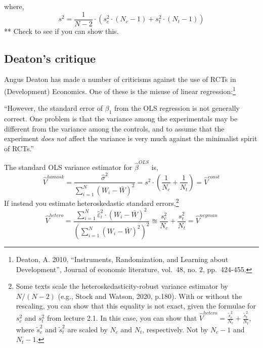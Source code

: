 \documentclass[
  letterpaper,
  DIV=11,
  numbers=noendperiod]{scrreprt}
\theoremstyle{definition}
\theoremstyle{remark}
\begin{document}
where, \[
        s^2 = \frac{1}{N-2}\cdot\left(s^2_c\cdot(N_c-1)+s^2_t\cdot(N_t-1)\right)
\] ** Check to see if you can show this.

\hypertarget{deatons-critique}{%
\subsection{Deaton's critique}\label{deatons-critique}}

Angus Deaton has made a number of criticisms against the use of RCTs in
(Development) Economics. One of these is the misuse of linear
regression:\footnote{Deaton, A. 2010, ``Instruments, Randomization, and
  Learning about Development'', Journal of economic literature, vol.~48,
  no. 2, pp.~424-455.}

\begin{tcolorbox}[enhanced jigsaw, breakable, colframe=quarto-callout-tip-color-frame, toptitle=1mm, toprule=.15mm, opacitybacktitle=0.6, opacityback=0, rightrule=.15mm, titlerule=0mm, colback=white, bottomtitle=1mm, title={Deaton (2010, p.442)}, arc=.35mm, coltitle=black, colbacktitle=quarto-callout-tip-color!10!white, leftrule=.75mm, bottomrule=.15mm, left=2mm]

``However, the standard error of \(\beta_1\) from the OLS regression is
not generally correct. One problem is that the variance among the
experimentals may be different from the variance among the controls, and
to assume that the experiment \textit{does not} affect the variance is
very much against the minimalist spirit of RCTs.''

\end{tcolorbox}

The standard OLS variance estimator for \(\hat{\beta}^{OLS}\) is, \[
        \hat{V}^{homosk} = \frac{\hat{\sigma}^2}{\sum_{i=1}^{N}(W_i-\bar{W})^2}=s^2\cdot\left(\frac{1}{N_c}+\frac{1}{N_t}\right)=\hat{V}^{const}
\] If instead you estimate heteroskedastic standard
errors,\footnote{Some texts scale the heteroskedasticity-robust variance estimator by $N/(N-2)$ (e.g., Stock and Watson, 2020, p.180). With or without the rescaling, you can show that this equality is not exact, given the formulae for $s^2_c$ and $s^2_t$ from lecture 2.1. In this case, you can show that $\hat{V}^{hetero}= \frac{\tilde{s}^2_c}{N_c}+\frac{\tilde{s}^2_t}{N_t}$, where $\tilde{s}^2_c$ and $\tilde{s}^2_t$ are scaled by $N_c$ and $N_t$, respectively. Not by $N_c-1$ and $N_t-1$.}
\[
            \hat{V}^{hetero} = \frac{\sum_{i=1}^{N}\hat{\varepsilon}_i^2\cdot(W_i-\bar{W})^2}{\left(\sum_{i=1}^{N}(W_i-\bar{W})^2\right)^2} \approxeq \frac{s^2_c}{N_c}+\frac{s^2_t}{N_t}=\hat{V}^{neyman}
\]
\end{document}
